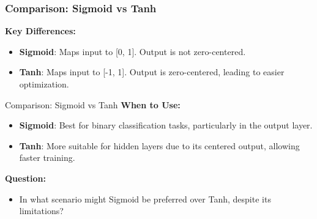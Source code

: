 \documentclass[serif, aspectratio=169]{beamer}
\begin{document}
\begin{frame}
    \frametitle{Comparison: Sigmoid vs Tanh}

    \textbf{Key Differences:}
    \begin{itemize}
        \item \textbf{Sigmoid}: Maps input to [0, 1]. Output is not zero-centered.
        \item \textbf{Tanh}: Maps input to [-1, 1]. Output is zero-centered, leading to easier optimization.
    \end{itemize}

    \begin{center}
    \end{center}

\end{frame}
\begin{frame}{Comparison: Sigmoid vs Tanh}
        \textbf{When to Use:}
    \begin{itemize}
        \item \textbf{Sigmoid}: Best for binary classification tasks, particularly in the output layer.
        \item \textbf{Tanh}: More suitable for hidden layers due to its centered output, allowing faster training.
    \end{itemize}
    \textbf{Question:}
    \begin{itemize}
        \item In what scenario might Sigmoid be preferred over Tanh, despite its limitations?
    \end{itemize}
\end{frame}
\end{document}
